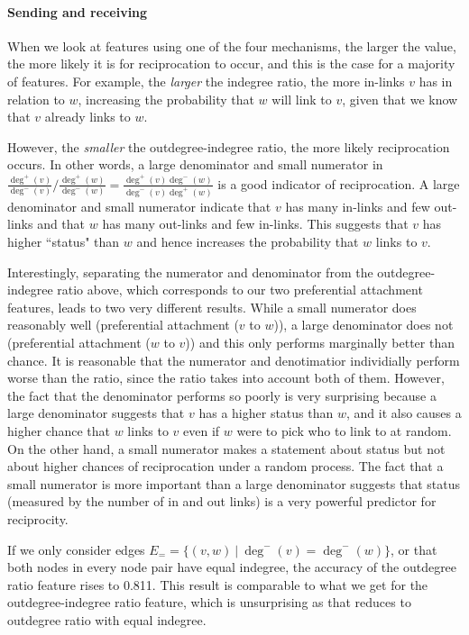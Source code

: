 \documentclass[conference]{IEEEtran}
\begin{document}
\paragraph{Sending and receiving}
When we look at features using one of the four mechanisms, the larger the value, the more likely it is for reciprocation to occur, and this is the case for a majority of features. 
For example, the \emph{larger} the indegree ratio, the more in-links $v$ has in relation to $w$, increasing the probability that $w$ will link to $v$, given that we know that $v$ already links to $w$.

However, the \emph{smaller} the outdegree-indegree ratio, the more likely reciprocation occurs. 
In other words, a large denominator and small numerator in $\frac{\deg^+(v)}{\deg^-(v)} / \frac{\deg^+(w)}{\deg^-(w)} = \frac{\deg^+(v)\deg^-(w)}{\deg^-(v)\deg^+(w)}$ is a good indicator of reciprocation. A large denominator and small numerator indicate that $v$ has many in-links and few out-links and that $w$ has many out-links and few in-links. This suggests that $v$ has higher ``status" than $w$ and hence increases the probability that $w$ links to $v$.

Interestingly, separating the numerator and denominator from the
outdegree-indegree ratio above, which corresponds to our two
preferential attachment features, leads to two very different
results.  While a small numerator does reasonably well (preferential
attachment ($v$ to $w$)), a large denominator does not (preferential
attachment ($w$ to $v$)) and this only performs marginally better than
chance. It is reasonable that the numerator and denotimatior
individially perform worse than the ratio, since the ratio takes into
account both of them. However, the fact that the denominator performs
so poorly is very surprising because a large denominator suggests
that $v$ has a higher status than $w$, and it also causes a higher
chance that $w$ links to $v$ even if $w$ were to pick who to link to
at random. On the other hand, a small numerator makes a statement
about status but not about higher chances of reciprocation under a
random process. The fact that a small numerator is more important than
a large denominator suggests that status (measured by the number of in
and out links) is a very powerful predictor for reciprocity.

If we only consider edges $E_= = \{(v,w)~|~\deg^-(v) = \deg^-(w)\}$, or that both nodes in every node pair have equal indegree, the accuracy of the outdegree ratio feature rises to 0.811. This result is comparable to what we get for the outdegree-indegree ratio feature, which is unsurprising as that reduces to outdegree ratio with equal indegree. 
\end{document}
